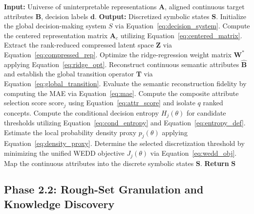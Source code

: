 \documentclass[make,article,submit,pdftex,moreauthors]{Definitions/mdpi}
\newcommand{\matA}{\mathbf{A}}
\newcommand{\matB}{\mathbf{B}}
\newcommand{\hatB}{\widehat{\mathbf{B}}}
\newcommand{\matT}{\mathbf{T}}
\newcommand{\matW}{\mathbf{W}}
\newcommand{\matZ}{\mathbf{Z}}
\begin{document}
\begin{algorithm}[!ht]
\caption{Neural-to-Semantic Transition and WEDD Discretization (Phases 1 and 2.1)}
\label{alg:phase1_wedd}
\begin{algorithmic}[1]
\Statex \textbf{Input:} Universe of uninterpretable representations $\matA$, aligned continuous target attributes $\matB$, decision labels $\mathbf{d}$.
\Statex \textbf{Output:} Discretized symbolic states $\mathbf{S}$.
\State Initialize the global decision-making system $S$ via Equation~\eqref{eq:decision_system}.
\State Compute the centered representation matrix $\matA_c$ utilizing Equation~\eqref{eq:centered_matrix}.
\State Extract the rank-reduced compressed latent space $\matZ$ via Equation~\eqref{eq:compressed_rep}.
\State Optimize the ridge-regression weight matrix $\matW^{\ast}$ applying Equation~\eqref{eq:ridge_opt}.
\State Reconstruct continuous semantic attributes $\hatB$ and establish the global transition operator $\matT$ via Equation~\eqref{eq:global_transition}.
\State Evaluate the semantic reconstruction fidelity by computing the MAE via Equation~\eqref{eq:mae}.
\State Compute the composite attribute selection score $\mathrm{score}_j$ using Equation~\eqref{eq:attr_score} and isolate $q$ ranked concepts.
    \State Compute the conditional decision entropy $H_j(\theta)$ for candidate thresholds utilizing Equation~\eqref{eq:cond_entropy} and Equation~\eqref{eq:entropy_def}.
    \State Estimate the local probability density proxy $p_j(\theta)$ applying Equation~\eqref{eq:density_proxy}.
    \State Determine the selected discretization threshold by minimizing the unified WEDD objective $J_j(\theta)$ via Equation~\eqref{eq:wedd_obj}.
\EndFor
\State Map the continuous attributes into the discrete symbolic states $\mathbf{S}$.
\State \textbf{Return} $\mathbf{S}$
\end{algorithmic}
\end{algorithm}

\subsection{Phase 2.2: Rough-Set Granulation and Knowledge Discovery}
\label{subsec:rough_set_granulation}
\end{document}
